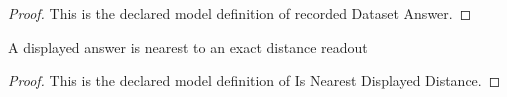 \begin{proof}
  This is the declared model definition of recorded Dataset Answer.
\end{proof}
\begin{definition}
  \label{def:physics:phyx-mini-0670:phyxminiproblems-problemphyxmini0670-isnearestdisplayeddistance}
  A displayed answer is nearest to an exact distance readout
\end{definition}
\begin{proof}
  This is the declared model definition of Is Nearest Displayed Distance.
\end{proof}
